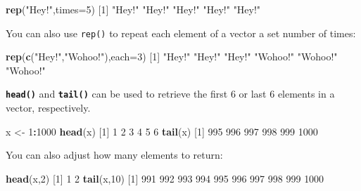 \documentclass[
]{book}
\newenvironment{Shaded}{\begin{snugshade}}{\end{snugshade}}
\newcommand{\AttributeTok}[1]{\textcolor[rgb]{0.13,0.29,0.53}{#1}}
\newcommand{\DecValTok}[1]{\textcolor[rgb]{0.00,0.00,0.81}{#1}}
\newcommand{\FunctionTok}[1]{\textcolor[rgb]{0.13,0.29,0.53}{\textbf{#1}}}
\newcommand{\NormalTok}[1]{#1}
\newcommand{\OtherTok}[1]{\textcolor[rgb]{0.56,0.35,0.01}{#1}}
\newcommand{\SpecialCharTok}[1]{\textcolor[rgb]{0.81,0.36,0.00}{\textbf{#1}}}
\newcommand{\StringTok}[1]{\textcolor[rgb]{0.31,0.60,0.02}{#1}}
\begin{document}
\begin{Shaded}
\begin{Highlighting}[]
\FunctionTok{rep}\NormalTok{(}\StringTok{"Hey!"}\NormalTok{,}\AttributeTok{times=}\DecValTok{5}\NormalTok{)}
\NormalTok{[}\DecValTok{1}\NormalTok{] }\StringTok{"Hey!"} \StringTok{"Hey!"} \StringTok{"Hey!"} \StringTok{"Hey!"} \StringTok{"Hey!"}
\end{Highlighting}
\end{Shaded}

You can also use \texttt{rep()} to repeat each element of a vector a set number of times:

\begin{Shaded}
\begin{Highlighting}[]
\FunctionTok{rep}\NormalTok{(}\FunctionTok{c}\NormalTok{(}\StringTok{"Hey!"}\NormalTok{,}\StringTok{"Wohoo!"}\NormalTok{),}\AttributeTok{each=}\DecValTok{3}\NormalTok{)}
\NormalTok{[}\DecValTok{1}\NormalTok{] }\StringTok{"Hey!"}   \StringTok{"Hey!"}   \StringTok{"Hey!"}   \StringTok{"Wohoo!"} \StringTok{"Wohoo!"} \StringTok{"Wohoo!"}
\end{Highlighting}
\end{Shaded}

\textbf{\texttt{head()}} and \textbf{\texttt{tail()}} can be used to retrieve the first 6 or last 6 elements in a vector, respectively.

\begin{Shaded}
\begin{Highlighting}[]
\NormalTok{x }\OtherTok{\textless{}{-}} \DecValTok{1}\SpecialCharTok{:}\DecValTok{1000}
\FunctionTok{head}\NormalTok{(x)}
\NormalTok{[}\DecValTok{1}\NormalTok{] }\DecValTok{1} \DecValTok{2} \DecValTok{3} \DecValTok{4} \DecValTok{5} \DecValTok{6}
\FunctionTok{tail}\NormalTok{(x)}
\NormalTok{[}\DecValTok{1}\NormalTok{]  }\DecValTok{995}  \DecValTok{996}  \DecValTok{997}  \DecValTok{998}  \DecValTok{999} \DecValTok{1000}
\end{Highlighting}
\end{Shaded}

You can also adjust how many elements to return:

\begin{Shaded}
\begin{Highlighting}[]
\FunctionTok{head}\NormalTok{(x,}\DecValTok{2}\NormalTok{)}
\NormalTok{[}\DecValTok{1}\NormalTok{] }\DecValTok{1} \DecValTok{2}
\FunctionTok{tail}\NormalTok{(x,}\DecValTok{10}\NormalTok{)}
\NormalTok{ [}\DecValTok{1}\NormalTok{]  }\DecValTok{991}  \DecValTok{992}  \DecValTok{993}  \DecValTok{994}  \DecValTok{995}  \DecValTok{996}  \DecValTok{997}  \DecValTok{998}  \DecValTok{999} \DecValTok{1000}
\end{Highlighting}
\end{Shaded}
\end{document}
